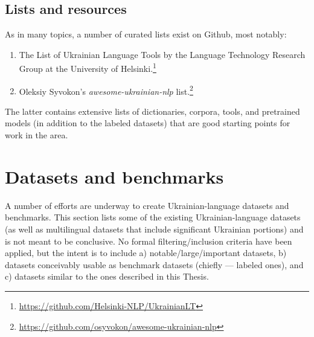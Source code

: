 
\subsection{Lists and resources}
As in many topics, a number of curated lists exist on Github, most notably:
\begin{enumerate}
    \tightlist
    \item The List of Ukrainian Language Tools by the Language Technology Research Group at the University of Helsinki.\footnote{\href{https://github.com/Helsinki-NLP/UkrainianLT}{https://github.com/Helsinki-NLP/UkrainianLT}}
    \item Oleksiy Syvokon's \textit{awesome-ukrainian-nlp} list.\footnote{\href{https://github.com/osyvokon/awesome-ukrainian-nlp}{https://github.com/osyvokon/awesome-ukrainian-nlp}}
\end{enumerate}

The latter contains extensive lists of dictionaries, corpora, tools, and pretrained models (in addition to the labeled datasets) that are good starting points for work in the area. 

\section{Datasets and benchmarks}\label{datasets}\label{sec:related-ukr-datasets}
A number of efforts are underway to create Ukrainian-language datasets and benchmarks. 
This section lists some of the existing Ukrainian-language datasets (as well as multilingual datasets that include significant Ukrainian portions) and is not meant to be conclusive. No formal filtering/inclusion criteria have been applied, but the intent is to include a) notable/large/important datasets, b) datasets conceivably usable as benchmark datasets (chiefly — labeled ones), and c) datasets similar to the ones described in this Thesis.

